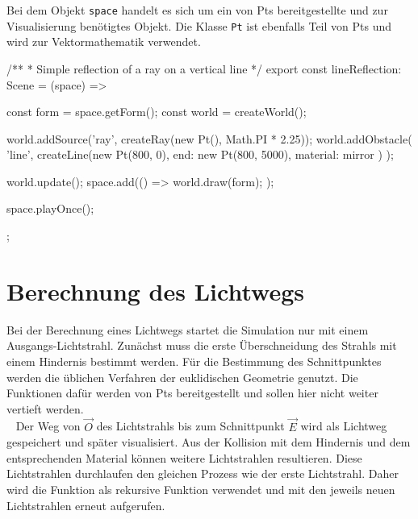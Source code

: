 Bei dem Objekt \texttt{space} handelt es sich um ein von Pts bereitgestellte und zur Visualisierung benötigtes Objekt. 
Die Klasse \texttt{Pt} ist ebenfalls Teil von Pts und wird zur Vektormathematik verwendet.
\newpage

\begin{verbnobox}[\scriptsize\mbox{}]
/**
 * Simple reflection of a ray on a vertical line
 */
export const lineReflection: Scene = (space) => {
    const form = space.getForm();
    const world = createWorld();

    world.addSource('ray', createRay(new Pt(), Math.PI * 2.25));
    world.addObstacle(
        'line',
        createLine(new Pt(800, 0), { end: new Pt(800, 5000), material: mirror })
    );

    world.update();
    space.add(() => {
        world.draw(form);
    });

    space.playOnce();
};
\end{verbnobox}

\section{Berechnung des Lichtwegs}
Bei der Berechnung eines Lichtwegs startet die Simulation nur mit einem Ausgangs-Lichtstrahl.
Zunächst muss die erste Überschneidung des Strahls mit einem Hindernis bestimmt werden. 
Für die Bestimmung des Schnittpunktes werden die üblichen Verfahren der euklidischen Geometrie genutzt. 
Die Funktionen dafür werden von Pts bereitgestellt und sollen hier nicht weiter vertieft werden. \\ 
Der Weg von $ \vec{O} $ des Lichtstrahls bis zum Schnittpunkt $ \vec{E} $ wird als Lichtweg gespeichert und später visualisiert.
Aus der Kollision mit dem Hindernis und dem entsprechenden Material können weitere Lichtstrahlen resultieren. 
Diese Lichtstrahlen durchlaufen den gleichen Prozess wie der erste Lichtstrahl. 
Daher wird die Funktion als rekursive Funktion verwendet und mit den jeweils neuen Lichtstrahlen erneut aufgerufen.


